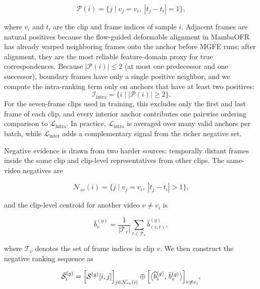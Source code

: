 \begin{equation}
\mathcal{P}(i)=
\bigl\{
j \mid v_j=v_i,\;
|t_j-t_i|=1
\bigr\},
\end{equation}

where $v_i$ and $t_i$ are the clip and frame indices of sample $i$. Adjacent frames are natural positives because the flow-guided deformable alignment in MambaOFR has already warped neighboring frames onto the anchor before MGFE runs; after alignment, they are the most reliable feature-domain proxy for true correspondences. Because $|\mathcal{P}(i)| \le 2$ (at most one predecessor and one successor), boundary frames have only a single positive neighbor, and we compute the intra-ranking term only on anchors that have at least two positives:
\begin{equation}
\mathcal{I}_{\text{intra}}=
\bigl\{
i \mid |\mathcal{P}(i)| \ge 2
\bigr\}.
\end{equation}
For the seven-frame clips used in training, this excludes only the first and last frame of each clip, and every interior anchor contributes one pairwise ordering comparison to $\mathcal{L}_{\text{intra}}$. In practice, $\mathcal{L}_{\text{intra}}$ is averaged over many valid anchors per batch, while $\mathcal{L}_{\text{inter}}$ adds a complementary signal from the richer negative set.

Negative evidence is drawn from two harder sources: temporally distant frames inside the same clip and clip-level representatives from other clips. The same-video negatives are

\begin{equation}
\mathcal{N}_{sv}(i)=
\bigl\{
j \mid v_j=v_i,\;
|t_j-t_i|>1
\bigr\},
\end{equation}

and the clip-level centroid for another video $v\neq v_i$ is

\begin{equation}
\bar{b}_{v}^{(g)} =
\frac{1}{|\mathcal{T}_v|}
\sum_{t\in\mathcal{T}_v}
\widehat{b}_{(v,t)}^{(g)},
\end{equation}

where $\mathcal{T}_v$ denotes the set of frame indices in clip $v$. We then construct the negative ranking sequence as

\begin{equation}
\bar{\mathcal{S}}_i^{(g)} =
\Bigl[\mathcal{S}^{(g)}[i,j]\Bigr]_{j\in\mathcal{N}_{sv}(i)}
\oplus
\Bigl[\bigl\langle \widehat{b}_i^{(g)},\,\bar{b}_v^{(g)} \bigr\rangle\Bigr]_{v\neq v_i},
\end{equation}

